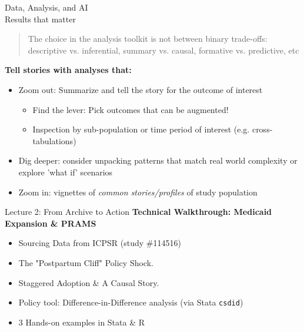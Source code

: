 \documentclass[aspectratio=169, 10pt]{beamer}
\begin{document}
\begin{frame}{Data, Analysis, and AI \\ Results that matter}
\begin{quote}The choice in the analysis toolkit is not between binary trade-offs: descriptive vs. inferential, summary vs. causal, formative vs. predictive, etc \end{quote}  
\vfill
 \textbf{Tell stories with analyses that: }
\pause 
    \begin{itemize} 
	\item {\color{TXOrange} Zoom out: }Summarize and tell the story for the outcome of interest
	\begin{itemize}
	   \item {\color{TXOrange}Find the lever: }Pick outcomes that can be augmented! 
	  \item Inspection by sub-population or time period of interest (e.g. cross-tabulations) \pause
	\end{itemize}
		\item {\color{TXOrange} Dig deeper: }consider unpacking patterns that match real world complexity or explore 'what if' scenarios
	\item {\color{TXOrange} Zoom in: }vignettes of \textit{common stories/profiles} of study population
 
    \end{itemize}

\end{frame}





\begin{frame}{Lecture 2: From Archive to Action}
    \textbf{Technical Walkthrough: Medicaid Expansion \& PRAMS}
    \vfill
    \begin{itemize}
        \item Sourcing Data from ICPSR (study \#114516)
        \item The "Postpartum Cliff" Policy Shock.
        \item Staggered Adoption \& A Causal Story.
        \item Policy tool: Difference-in-Difference analysis (via Stata \texttt{csdid})
        \item 3 Hands-on examples in Stata \& R
    \end{itemize}
\end{frame}
\end{document}
